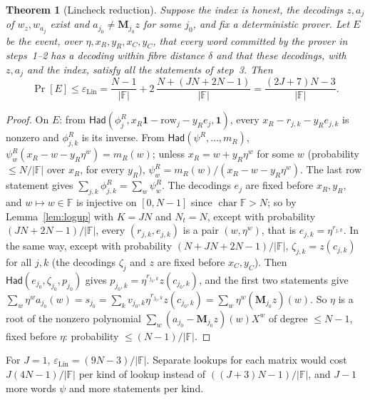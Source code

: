 \documentclass[11pt]{article}
\newtheorem{theorem}{Theorem}
\theoremstyle{definition}
\newcommand{\F}{\mathbb{F}}
\newcommand{\iv}[2]{[#1,#2]}
\begin{document}
\begin{theorem}[Lincheck reduction]\label{thm:lin}
Suppose the index is honest, the decodings $z,a_j$ of $w_z,w_{a_j}$ exist and $a_{j_0}\ne\mathbf M_{j_0}z$ for some $j_0$, and fix a deterministic prover. Let $E$ be the event, over $\eta,x_R,y_R,x_C,y_C$, that every word committed by the prover in steps~1--2 has a decoding within fibre distance $\delta$ and that these decodings, with $z,a_j$ and the index, satisfy all the statements of step~3. Then
\[
\Pr[E]\le\varepsilon_{\mathrm{Lin}}=\frac{N-1}{|\F|}+2\,\frac{N+(JN+2N-1)}{|\F|}=\frac{(2J+7)N-3}{|\F|}.
\]
\end{theorem}
\begin{proof}
On $E$: from $\mathsf{Had}(\phi^R_j,x_R\mathbf 1-\mathrm{row}_j-y_Re_j,\mathbf 1)$, every $x_R-r_{j,k}-y_Re_{j,k}$ is nonzero and $\phi^R_{j,k}$ is its inverse. From $\mathsf{Had}(\psi^R,\dots,m_R)$, $\psi^R_w(x_R-w-y_R\eta^w)=m_R(w)$; unless $x_R=w+y_R\eta^w$ for some $w$ (probability $\le N/|\F|$ over $x_R$, for every $y_R$), $\psi^R_w=m_R(w)/(x_R-w-y_R\eta^w)$. The last row statement gives $\sum_{j,k}\phi^R_{j,k}=\sum_w\psi^R_w$.
The decodings $e_j$ are fixed before $x_R,y_R$, and $w\mapsto w\in\F$ is injective on $\iv0{N-1}$ since $\operatorname{char}\F>N$; so by Lemma~\ref{lem:logup} with $K=JN$ and $N_t=N$, except with probability $(JN+2N-1)/|\F|$, every $(r_{j,k},e_{j,k})$ is a pair $(w,\eta^w)$, that is $e_{j,k}=\eta^{r_{j,k}}$.
In the same way, except with probability $(N+JN+2N-1)/|\F|$, $\zeta_{j,k}=z(c_{j,k})$ for all $j,k$ (the decodings $\zeta_j$ and $z$ are fixed before $x_C,y_C$).
Then $\mathsf{Had}(e_{j_0},\zeta_{j_0},p_{j_0})$ gives $p_{j_0,k}=\eta^{r_{j_0,k}}z(c_{j_0,k})$, and the first two statements give
$\sum_w\eta^wa_{j_0}(w)=s_{j_0}=\sum_kv_{j_0,k}\eta^{r_{j_0,k}}z(c_{j_0,k})=\sum_w\eta^w(\mathbf M_{j_0}z)(w)$.
So $\eta$ is a root of the nonzero polynomial $\sum_w(a_{j_0}-\mathbf M_{j_0}z)(w)X^w$ of degree $\le N-1$, fixed before $\eta$: probability $\le(N-1)/|\F|$.
\end{proof}

For $J=1$, $\varepsilon_{\mathrm{Lin}}=(9N-3)/|\F|$. Separate lookups for each matrix would cost $J(4N-1)/|\F|$ per kind of lookup instead of $((J+3)N-1)/|\F|$, and $J-1$ more words $\psi$ and more statements per kind.
\end{document}
